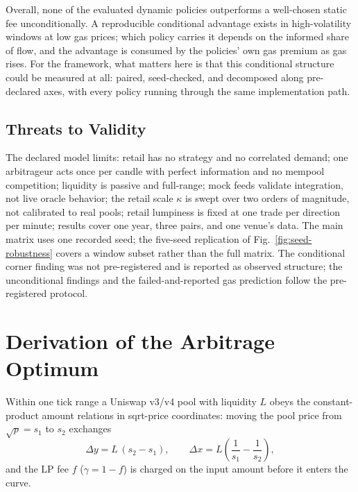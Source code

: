 \documentclass[a4paper,conference]{IEEEtran}
\begin{document}
Overall, none of the evaluated dynamic policies outperforms a
well-chosen static fee unconditionally. A reproducible conditional
advantage exists in high-volatility windows at low gas prices; which
policy carries it depends on the informed share of flow, and the
advantage is consumed by the policies' own gas premium as gas rises.
For the framework, what matters here is that this conditional
structure could be measured at all: paired, seed-checked, and
decomposed along pre-declared axes, with every policy running through
the same implementation path.

\subsection{Threats to Validity}

The declared model limits: retail has no strategy and no correlated
demand; one arbitrageur acts once per candle with perfect information
and no mempool competition; liquidity is passive and full-range; mock
feeds validate integration, not live oracle behavior; the retail scale
$\kappa$ is swept over two orders of magnitude, not calibrated to real
pools; retail lumpiness is fixed at one trade per
direction per minute; results cover one year, three pairs, and one
venue's data. The main matrix uses one recorded seed; the five-seed
replication of Fig.~\ref{fig:seed-robustness} covers a window subset
rather than the full matrix. The conditional corner finding was not
pre-registered and is reported as observed structure; the unconditional
findings and the failed-and-reported gas prediction follow the
pre-registered protocol.


\section{Derivation of the Arbitrage Optimum}
\label{app:arb}

Within one tick range a Uniswap v3/v4 pool with liquidity $L$ obeys the
constant-product amount relations in sqrt-price coordinates: moving the
pool price from $\sqrt{p}=s_1$ to $s_2$ exchanges
\begin{equation}
  \Delta y = L\,(s_2-s_1),\qquad
  \Delta x = L\left(\frac{1}{s_1}-\frac{1}{s_2}\right),
  \label{eq:app-amounts}
\end{equation}
and the LP fee $f$ ($\gamma=1-f$) is charged on the input amount before
it enters the curve.
\end{document}
